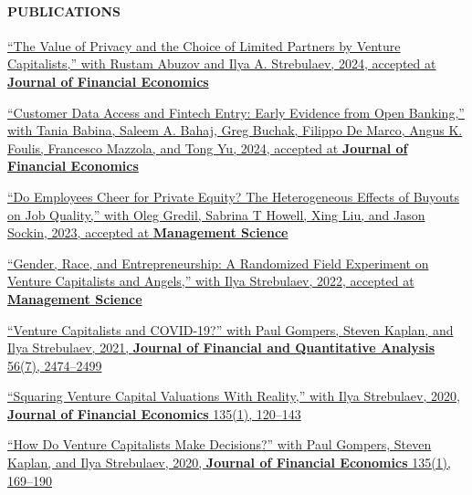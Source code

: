 \documentclass[11pt]{article}
\begin{document}
\paragraph{PUBLICATIONS}
\begin{nondatelist}
    \item \href{https://papers.ssrn.com/sol3/papers.cfm?abstract_id=4235337}{%
        ``The Value of Privacy and the Choice of Limited Partners by Venture Capitalists,'' 
        with Rustam Abuzov and Ilya A. Strebulaev, 
        2024, accepted at \textbf{Journal of Financial Economics}}

    \item \href{https://papers.ssrn.com/sol3/papers.cfm?abstract_id=4071214}{%
        ``Customer Data Access and Fintech Entry: Early Evidence from Open Banking,'' 
        with Tania Babina, Saleem A. Bahaj, Greg Buchak, Filippo De Marco, Angus K. Foulis, Francesco Mazzola, and Tong Yu, 
        2024, accepted at \textbf{Journal of Financial Economics}}

    \item \href{https://papers.ssrn.com/sol3/papers.cfm?abstract_id=3912230}{%
        ``Do Employees Cheer for Private Equity? The Heterogeneous Effects of Buyouts on Job Quality,'' 
        with Oleg Gredil, Sabrina T Howell, Xing Liu, and Jason Sockin, 
        2023, accepted at \textbf{Management Science}}

    \item \href{https://papers.ssrn.com/sol3/papers.cfm?abstract_id=3301982}{%
        ``Gender, Race, and Entrepreneurship: A Randomized Field Experiment on Venture Capitalists and Angels,'' 
        with Ilya Strebulaev, 
        2022, accepted at \textbf{Management Science}}

    \item \href{https://papers.ssrn.com/sol3/papers.cfm?abstract_id=3669345}{%
        ``Venture Capitalists and COVID-19?'' 
        with Paul Gompers, Steven Kaplan, and Ilya Strebulaev, 
        2021, \textbf{Journal of Financial and Quantitative Analysis} 56(7), 2474--2499}

    \item \href{https://papers.ssrn.com/sol3/papers.cfm?abstract_id=2955455}{%
        ``Squaring Venture Capital Valuations With Reality,'' 
        with Ilya Strebulaev, 
        2020, \textbf{Journal of Financial Economics} 135(1), 120--143}

    \item \href{https://papers.ssrn.com/sol3/papers.cfm?abstract_id=2801385}{%
        ``How Do Venture Capitalists Make Decisions?'' 
        with Paul Gompers, Steven Kaplan, and Ilya Strebulaev, 
        2020, \textbf{Journal of Financial Economics} 135(1), 169--190}


\end{nondatelist}
\end{document}
